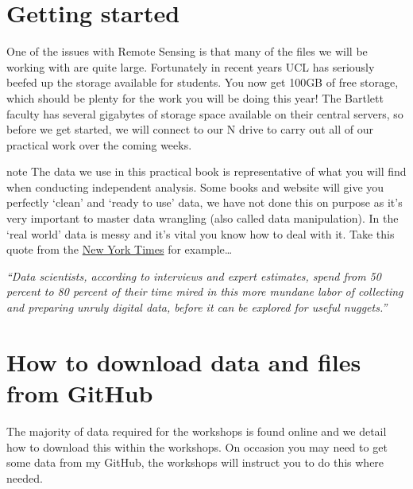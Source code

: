 \documentclass[
]{book}
\begin{document}
\hypertarget{getting-started}{%
\section*{Getting started}\label{getting-started}}

One of the issues with Remote Sensing is that many of the files we will be working with are quite large. Fortunately in recent years UCL has seriously beefed up the storage available for students. You now get 100GB of free storage, which should be plenty for the work you will be doing this year! The Bartlett faculty has several gigabytes of storage space available on their central servers, so before we get started, we will connect to our N drive to carry out all of our practical work over the coming weeks.

\begin{infobox}{note}
The data we use in this practical book is representative of what you will find when conducting independent analysis. Some books and website will give you perfectly `clean' and `ready to use' data, we have not done this on purpose as it's very important to master data wrangling (also called data manipulation). In the `real world' data is messy and it's vital you know how to deal with it. Take this quote from the \href{https://www.nytimes.com/2014/08/18/technology/for-big-data-scientists-hurdle-to-insights-is-janitor-work.html}{New York Times} for example\ldots{}

\emph{``Data scientists, according to interviews and expert estimates, spend from 50 percent to 80 percent of their time mired in this more mundane labor of collecting and preparing unruly digital data, before it can be explored for useful nuggets.''}

\end{infobox}

\hypertarget{how-to-download-data-and-files-from-github}{%
\section*{How to download data and files from GitHub}\label{how-to-download-data-and-files-from-github}}

The majority of data required for the workshops is found online and we detail how to download this within the workshops. On occasion you may need to get some data from my GitHub, the workshops will instruct you to do this where needed.
\end{document}
